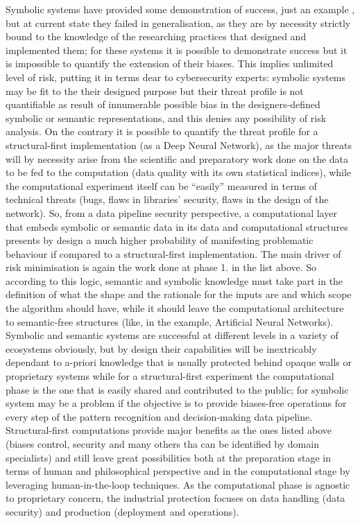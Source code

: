 \documentclass[14pt,a4paper]{extarticle}
\begin{document}
\newline
Symbolic systems have provided some demonstration of success, just an example \cite{SUNsymconn}, but at current state they failed in generalisation, as they are by necessity strictly bound to the knowledge of the researching practices that designed and implemented them; for these systems it is possible to demonstrate success but it is impossible to quantify the extension of their biases. This implies unlimited level of risk, putting it in terms dear to cybersecurity experts: symbolic systems may be fit to the their designed purpose but their threat profile is not quantifiable as result of innumerable possible bias in the designers-defined symbolic or semantic representations, and this denies any possibility of risk analysis. On the contrary it is possible to quantify the threat profile for a structural-first implementation (as a Deep Neural Network), as the major threats will by necessity arise from the scientific and preparatory work done on the data to be fed to the computation (data quality with its own statistical indices), while the computational experiment itself can be “easily” measured in terms of technical threats (bugs, flaws in libraries’ security, flaws in the design of the network). So, from a data pipeline security perspective, a computational layer that embeds symbolic or semantic data in its data and computational structures presents by design a much higher probability of manifesting problematic behaviour if compared to a structural-first implementation. The main driver of risk minimisation is again the work done at phase 1. in the list above. 
\newline
So according to this logic, semantic and symbolic knowledge must take part in the definition of what the shape and the rationale for the inputs are and which scope the algorithm should have, while it should leave the computational architecture to semantic-free structures (like, in the example, Artificial Neural Networks). Symbolic and semantic systems are successful at different levels in a variety of ecosystems obviously, but by design their capabilities will be inextricably dependant to a-priori knowledge that is usually protected behind opaque walls or proprietary systems while for a structural-first experiment the computational phase is the one that is easily shared and contributed to the public; for symbolic system may be a problem if the objective is to provide biases-free operations for every step of the pattern recognition and decision-making data pipeline. Structural-first computations provide major benefits as the ones listed above (biases control, security and many others tha can be identified by domain specialists) and still leave great possibilities both at the preparation stage in terms of human and philosophical perspective and in the computational stage by leveraging human-in-the-loop techniques. As the computational phase is agnostic to proprietary concern, the industrial protection focuses on data handling (data security) and production (deployment and operations).
\end{document}
